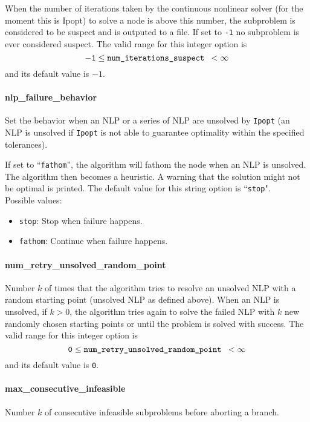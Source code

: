 When the number of iterations taken by the continuous nonlinear solver
(for the moment this is Ipopt) to solve a node is above this number,
the subproblem is
considered to be suspect and is outputed
to a file. If set to {\tt -1} no subproblem is ever considered suspect.
The valid range for this integer option is
$${\tt -1} \le \hbox{\tt num\_iterations\_suspect } <  \infty$$
and its default value is $-1$.


\paragraph{nlp\_failure\_behavior}
\label{nlp_failure_behavior}
Set the behavior when an NLP or a series of NLP are unsolved by {\tt Ipopt}
(an NLP is unsolved if {\tt Ipopt} is not able to guarantee optimality within the specified tolerances).

 If set to ``{\tt fathom}'', the algorithm will fathom the
node when an NLP is unsolved. The algorithm then becomes a
heuristic. A warning that the solution might not
be optimal is printed.
The default value for this string option is ``{\tt stop}".
\\
Possible values:
\begin{itemize}
   \item {\tt stop}: Stop when failure happens.
   \item {\tt fathom}: Continue when failure happens.
\end{itemize}

\paragraph{num\_retry\_unsolved\_random\_point}
\label{num_retry_unsolved_random_point}
Number $k$ of times that the algorithm tries to resolve an unsolved NLP with a
random starting point (unsolved NLP as defined above).
 When an NLP is unsolved, if $k > 0$, the algorithm tries
again to solve the failed NLP with $k$ new
randomly chosen starting points  or until the
problem is solved with success. The valid range for this integer option is
$${\tt 0} \le \hbox{\tt num\_retry\_unsolved\_random\_point } <  \infty$$
and its default value is {\tt 0}.




\paragraph{max\_consecutive\_infeasible}
\label{max_consecutive_infeasible}
Number $k$ of consecutive infeasible subproblems before aborting a branch.

